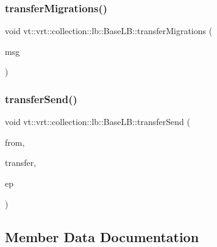 \subsubsection{\texorpdfstring{transfer\+Migrations()}{transferMigrations()}}
{\footnotesize\ttfamily void vt\+::vrt\+::collection\+::lb\+::\+Base\+L\+B\+::transfer\+Migrations (\begin{DoxyParamCaption}\item[{\hyperlink{structvt_1_1vrt_1_1collection_1_1lb_1_1_transfer_msg}{Transfer\+Msg}$<$ \hyperlink{structvt_1_1vrt_1_1collection_1_1lb_1_1_base_l_b_a329e8179ec41a1bd4924c79fe23a79af}{Transfer\+Vec\+Type} $>$ $\ast$}]{msg }\end{DoxyParamCaption})}

\mbox{\label{structvt_1_1vrt_1_1collection_1_1lb_1_1_base_l_b_a60135618fefc0ad5d09638f29a848be7}} 
\subsubsection{\texorpdfstring{transfer\+Send()}{transferSend()}}
{\footnotesize\ttfamily void vt\+::vrt\+::collection\+::lb\+::\+Base\+L\+B\+::transfer\+Send (\begin{DoxyParamCaption}\item[{\hyperlink{namespacevt_a866da9d0efc19c0a1ce79e9e492f47e2}{Node\+Type}}]{from,  }\item[{\hyperlink{structvt_1_1vrt_1_1collection_1_1lb_1_1_base_l_b_a329e8179ec41a1bd4924c79fe23a79af}{Transfer\+Vec\+Type} const \&}]{transfer,  }\item[{\hyperlink{namespacevt_a985a5adf291c34a3ca263b3378388236}{Epoch\+Type}}]{ep }\end{DoxyParamCaption})}



\subsection{Member Data Documentation}
\mbox{\label{structvt_1_1vrt_1_1collection_1_1lb_1_1_base_l_b_a2623b9a1e60be9f6413d86fbff9e80bf}} 
